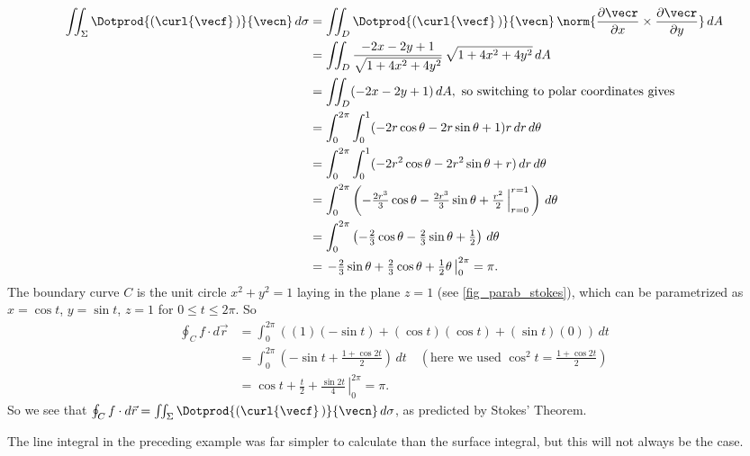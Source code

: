 { \begin{align*}
  \iint_{\Sigma} \Dotprod{(\curl{\vecf}\,)}{\vecn}\,d\sigma &=
   \iint_{D} \Dotprod{(\curl{\vecf}\,)}{\vecn}\,
   \norm{\frac{\partial \vecr}{\partial x}\times\frac{\partial \vecr}{\partial y}}\,dA\\
   &= \iint_{D} \frac{-2x-2y+1}{\sqrt{1 + 4x^2 + 4y^2}}\,\sqrt{1 + 4x^2 + 4y^2}\,dA\\
   &= \iint_{D} (-2x-2y+1)\,dA ,\text{ so switching to polar coordinates gives}\\
   &= \int_0^{2\pi} \int_0^1 (-2r\cos \theta - 2r\sin \theta + 1)r\,dr\,d\theta\\
   &= \int_0^{2\pi} \int_0^1 (-2r^2 \cos \theta - 2r^2 \sin \theta + r)\,dr\,d\theta\\
   &= \int_0^{2\pi} \left( -\tfrac{2r^3}{3} \cos \theta - \tfrac{2r^3}{3} \sin \theta +
   \tfrac{r^2}{2}\,\Big|_{r=0}^{r=1} \,\right)\,d\theta\\
   &= \int_0^{2\pi} \left( -\tfrac{2}{3} \cos \theta - \tfrac{2}{3} \sin \theta + \tfrac{1}{2} \right)\,d\theta\\
   &= \left.-\tfrac{2}{3} \sin \theta + \tfrac{2}{3} \cos \theta + \tfrac{1}{2}\theta\,\right|_0^{2\pi} = \pi .
 \end{align*}
 The boundary curve $C$ is the unit circle $x^2 + y^2 =1$ laying in the plane $z=1$ (see \autoref{fig_parab_stokes}), which can be parametrized as $x = \cos t$, $y = \sin t$, $z = 1$ for $0 \le t \le 2\pi$. So
 \begin{align*}
  \oint_{C}{f}\cdot d\vec{r} &= \int_0^{2\pi} ((1)(-\sin t) + (\cos t)(\cos t) + (\sin t)(0))\,dt\\
   &= \int_0^{2\pi} \left( -\sin t + \frac{1+\cos 2t}{2} \right) \,dt \quad \left( \text{here we used $\cos^2 t =
   \frac{1+\cos 2t}{2}$} \right)\\
   &= \left.\cos t + \frac{t}{2} + \frac{\sin 2t}{4}\,\right|_0^{2\pi} = \pi .
 \end{align*}
 So we see that $\oint_{C}{f}\cdot d\vec{r}=\iint_{\Sigma} \Dotprod{(\curl{\vecf}\,)}{\vecn} \,d\sigma$, as predicted by Stokes' Theorem.}

The line integral in the preceding example was far simpler to calculate than the surface integral, but this will not always be the case.

